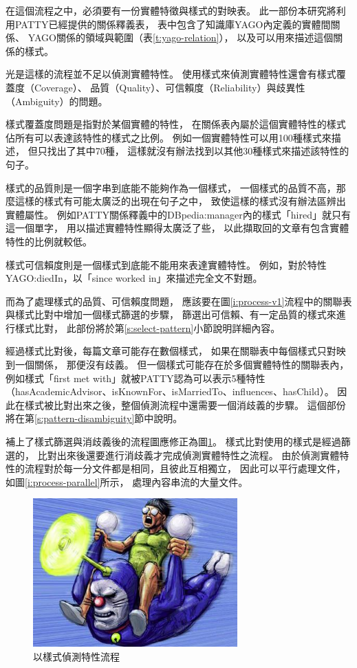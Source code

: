 在這個流程之中，必須要有一份實體特徵與樣式的對映表。
此一部份本研究將利用PATTY已經提供的關係釋義表，
表中包含了知識庫YAGO內定義的實體間關係、
YAGO關係的領域與範圍（表\ref{t:yago-relation}），
以及可以用來描述這個關係的樣式。



光是這樣的流程並不足以偵測實體特性。
使用樣式來偵測實體特性還會有樣式覆蓋度（Coverage）、
品質（Quality）、可信賴度（Reliability）與歧異性（Ambiguity）的問題。

樣式覆蓋度問題是指對於某個實體的特性，
在關係表內屬於這個實體特性的樣式佔所有可以表達該特性的樣式之比例。
例如一個實體特性可以用100種樣式來描述，
但只找出了其中70種，
這樣就沒有辦法找到以其他30種樣式來描述該特性的句子。

樣式的品質則是一個字串到底能不能夠作為一個樣式，    %
一個樣式的品質不高，那麼這樣的樣式有可能太廣泛的出現在句子之中，
致使這樣的樣式沒有辦法區辨出實體屬性。
例如PATTY關係釋義中的DBpedia:manager內的樣式「hired」就只有這一個單字，
用以描述實體特性顯得太廣泛了些，
以此擷取回的文章有包含實體特性的比例就較低。

樣式可信賴度則是一個樣式到底能不能用來表達實體特性。
例如，對於特性YAGO:diedIn，以「since worked in」來描述完全文不對題。

而為了處理樣式的品質、可信賴度問題，
應該要在圖\ref{i:process-v1}流程中的關聯表與樣式比對中增加一個樣式篩選的步驟，
篩選出可信賴、有一定品質的樣式來進行樣式比對，
此部份將於第\ref{s:select-pattern}小節說明詳細內容。

經過樣式比對後，每篇文章可能存在數個樣式，
如果在關聯表中每個樣式只對映到一個關係，
那便沒有歧義。
但一個樣式可能存在於多個實體特性的關聯表內，
例如樣式「first met with」就被PATTY認為可以表示5種特性（hasAcademicAdvisor、isKnownFor、isMarriedTo、influences、hasChild）。
因此在樣式被比對出來之後，整個偵測流程中還需要一個消歧義的步驟。
這個部份將在第\ref{s:pattern-disambiguity}節中說明。

補上了樣式篩選與消歧義後的流程圖應修正為圖\ref{i:process-v2}。
樣式比對使用的樣式是經過篩選的，
比對出來後還要進行消歧義才完成偵測實體特性之流程。
由於偵測實體特性的流程對於每一分文件都是相同，且彼此互相獨立，
因此可以平行處理文件，如圖\ref{i:process-parallel}所示，
處理內容串流的大量文件。

\begin{figure}
    \centering
    \includegraphics[width=0.7\textwidth]{images/00-tmp-img}    %
    \caption{以樣式偵測特性流程}
    \label{i:process-v2}
\end{figure}

